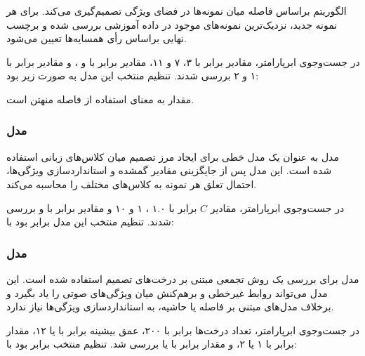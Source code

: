 \documentclass[12pt,a4paper,oneside]{report}
\begin{document}
الگوریتم  براساس فاصله میان نمونه‌ها در فضای
ویژگی تصمیم‌گیری می‌کند. برای هر نمونه جدید، نزدیک‌ترین نمونه‌های موجود در
داده آموزشی بررسی شده و برچسب نهایی براساس رأی همسایه‌ها تعیین می‌شود.

در جست‌وجوی ابرپارامتر، مقادیر
 برابر با ۳، ۷ و ۱۱،
مقادیر  برابر با  و
، و مقادیر  برابر با ۱ و ۲ بررسی
شدند. تنظیم منتخب این مدل به صورت زیر بود:

\begin{center}
\end{center}

مقدار  به معنای استفاده از فاصله منهتن است.


\subsubsection{مدل }

مدل  به عنوان یک مدل خطی برای ایجاد مرز تصمیم
میان کلاس‌های زبانی استفاده شده است. این مدل پس از جایگزینی مقادیر گمشده و
استانداردسازی ویژگی‌ها، احتمال تعلق هر نمونه به کلاس‌های مختلف را محاسبه
می‌کند.

در جست‌وجوی ابرپارامتر، مقادیر $C$ برابر با ۱.۰ ، ۱ و ۱۰ و مقادیر
 برابر با  و
 بررسی شدند. تنظیم منتخب این مدل برابر بود با:

\begin{center}
\end{center}


\subsubsection{مدل }

مدل  برای بررسی یک روش تجمعی مبتنی بر درخت‌های تصمیم
استفاده شده است. این مدل می‌تواند روابط غیرخطی و برهم‌کنش میان ویژگی‌های
صوتی را یاد بگیرد و برخلاف مدل‌های مبتنی بر فاصله یا حاشیه، به
استانداردسازی ویژگی‌ها نیاز ندارد.

در جست‌وجوی ابرپارامتر، تعداد درخت‌ها برابر با ۲۰۰، عمق بیشینه برابر با
 یا ۱۲، مقدار  برابر با
۱ یا ۲، و مقدار  برابر با
 یا  بررسی شد. تنظیم منتخب برابر
بود با:
\end{document}
